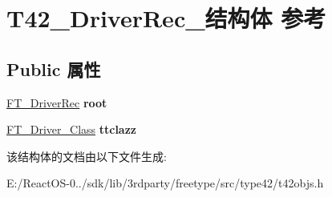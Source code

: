 \hypertarget{struct_t42___driver_rec__}{}\section{T42\+\_\+\+Driver\+Rec\+\_\+结构体 参考}
\label{struct_t42___driver_rec__}
\subsection*{Public 属性}
\begin{DoxyCompactItemize}
\item 
\mbox{\label{struct_t42___driver_rec___a80f24e9e8a78b6b13551908b23b7e0bb}} 
\hyperlink{struct_f_t___driver_rec__}{F\+T\+\_\+\+Driver\+Rec} {\bfseries root}
\item 
\mbox{\label{struct_t42___driver_rec___af1663e82615b5216d74005e46f8b88dd}} 
\hyperlink{struct_f_t___driver___class_rec__}{F\+T\+\_\+\+Driver\+\_\+\+Class} {\bfseries ttclazz}
\end{DoxyCompactItemize}


该结构体的文档由以下文件生成\+:\begin{DoxyCompactItemize}
\item 
E\+:/\+React\+O\+S-\/0../sdk/lib/3rdparty/freetype/src/type42/t42objs.\+h\end{DoxyCompactItemize}
